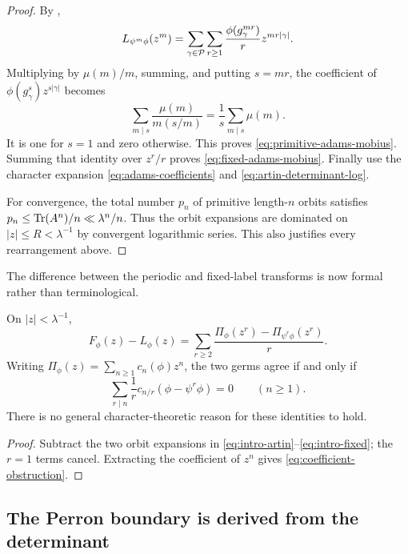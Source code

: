 \begin{proof}
By ,
\[
  L_{\psi^m\phi}(z^m)
  =\sum_{\gamma\in\mathcal P}\sum_{r\geq1}
     \frac{\phi(g_\gamma^{mr})}{r}z^{mr|\gamma|}.
\]
Multiplying by \(\mu(m)/m\), summing, and putting \(s=mr\), the coefficient
of \(\phi(g_\gamma^s)z^{s|\gamma|}\) becomes
\[
  \sum_{m\mid s}\frac{\mu(m)}{m(s/m)}
  =\frac1s\sum_{m\mid s}\mu(m).
\]
It is one for \(s=1\) and zero otherwise.  This proves
\eqref{eq:primitive-adams-mobius}.  Summing that identity over \(z^r/r\)
proves \eqref{eq:fixed-adams-mobius}.  Finally use the character expansion
\eqref{eq:adams-coefficients} and \eqref{eq:artin-determinant-log}.

For convergence, the total number \(p_n\) of primitive length-\(n\) orbits
satisfies \(p_n\leq\operatorname{Tr}(A^n)/n\ll\lambda^n/n\).  Thus the orbit expansions
are dominated on \(|z|\leq R<\lambda^{-1}\) by convergent logarithmic series.
This also justifies every rearrangement above.
\end{proof}

The difference between the periodic and fixed-label transforms is now
formal rather than terminological.

\begin{proposition}
\label{prop:artin-substitution-obstruction}
On \(|z|<\lambda^{-1}\),
\begin{equation}\label{eq:exact-f-minus-l}
  F_\phi(z)-L_\phi(z)
  =\sum_{r\geq2}\frac{
       \Pi_\phi(z^r)-\Pi_{\psi^r\phi}(z^r)}{r}.
\end{equation}
Writing \(\Pi_\phi(z)=\sum_{n\geq1}c_n(\phi)z^n\), the two germs agree if
and only if
\begin{equation}\label{eq:coefficient-obstruction}
  \sum_{r\mid n}\frac1r
    c_{n/r}(\phi-\psi^r\phi)=0
  \qquad(n\geq1).
\end{equation}
There is no general character-theoretic reason for these identities to hold.
\end{proposition}

\begin{proof}
Subtract the two orbit expansions in
\eqref{eq:intro-artin}--\eqref{eq:intro-fixed}; the \(r=1\) terms cancel.
Extracting the coefficient of \(z^n\) gives
\eqref{eq:coefficient-obstruction}.
\end{proof}

\subsection{The Perron boundary is derived from the determinant}


